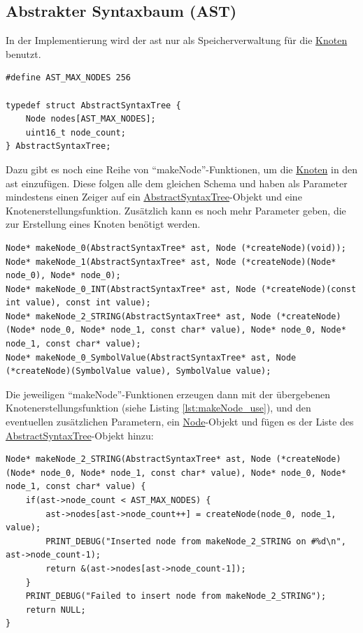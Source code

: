 \documentclass[oneside]{ausarbeitung}
\begin{document}
\subsection{Abstrakter Syntaxbaum (AST)}
\label{sub:impl_ast}
In der Implementierung wird der \ac{ast} nur als Speicherverwaltung für die \hyperref[sub:node]{Knoten} benutzt.
\begin{lstlisting}[label={lst:AbstractSyntaxTree}, caption={AbstractSyntaxTree}]
#define AST_MAX_NODES 256

typedef struct AbstractSyntaxTree {
    Node nodes[AST_MAX_NODES];
    uint16_t node_count;
} AbstractSyntaxTree;
\end{lstlisting}
Dazu gibt es noch eine Reihe von "`makeNode"'-Funktionen, um die \hyperref[sub:node]{Knoten} in den \ac{ast} einzufügen. Diese folgen alle dem gleichen Schema und haben als Parameter mindestens einen Zeiger auf ein \hyperref[lst:AbstractSyntaxTree]{AbstractSyntaxTree}-Objekt und eine Knotenerstellungsfunktion. Zusätzlich kann es noch mehr Parameter geben, die zur Erstellung eines Knoten benötigt werden.
\begin{lstlisting}[label={lst:makeNode}, caption={Auswahl verschiedener "`makeNode"'-Funktionen}]
Node* makeNode_0(AbstractSyntaxTree* ast, Node (*createNode)(void));
Node* makeNode_1(AbstractSyntaxTree* ast, Node (*createNode)(Node* node_0), Node* node_0);
Node* makeNode_0_INT(AbstractSyntaxTree* ast, Node (*createNode)(const int value), const int value);
Node* makeNode_2_STRING(AbstractSyntaxTree* ast, Node (*createNode)(Node* node_0, Node* node_1, const char* value), Node* node_0, Node* node_1, const char* value);
Node* makeNode_0_SymbolValue(AbstractSyntaxTree* ast, Node (*createNode)(SymbolValue value), SymbolValue value);
\end{lstlisting}

Die jeweiligen "`makeNode"'-Funktionen erzeugen dann mit der übergebenen Knotenerstellungsfunktion (siehe Listing \ref{lst:makeNode_use}), und den eventuellen zusätzlichen Parametern, ein \hyperref[lst:Node]{Node}-Objekt und fügen es der Liste des \hyperref[lst:AbstractSyntaxTree]{AbstractSyntaxTree}-Objekt hinzu:
\begin{lstlisting}[label={lst:makeNode}, caption={Auswahl der "`makeNode"'-Funktionen}]
Node* makeNode_2_STRING(AbstractSyntaxTree* ast, Node (*createNode)(Node* node_0, Node* node_1, const char* value), Node* node_0, Node* node_1, const char* value) {
    if(ast->node_count < AST_MAX_NODES) {
        ast->nodes[ast->node_count++] = createNode(node_0, node_1, value);
        PRINT_DEBUG("Inserted node from makeNode_2_STRING on #%d\n", ast->node_count-1);
        return &(ast->nodes[ast->node_count-1]);
    }
    PRINT_DEBUG("Failed to insert node from makeNode_2_STRING");
    return NULL;
}
\end{lstlisting}
\end{document}
